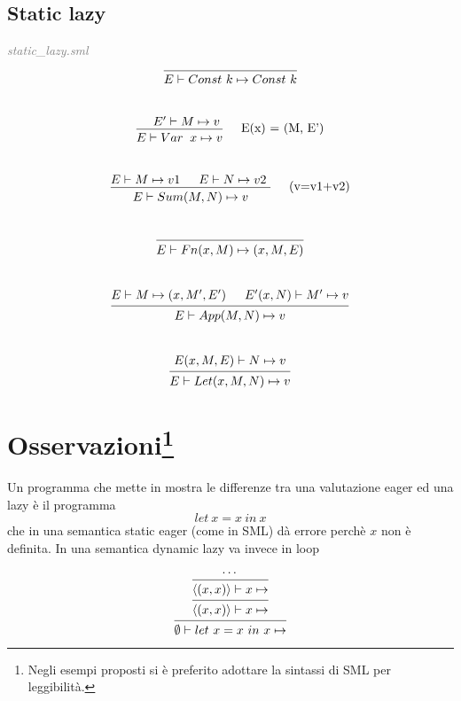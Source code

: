 \documentclass[a4paper]{article}
\begin{document}
	\subsection{Static lazy}
	\textit{\textcolor{gray}{static\_lazy.sml}} \\
	\[
		\begin{prooftree}
			\hypo{}
			\infer1[]{E \vdash Const \ k \mapsto Const \ k} 
		\end{prooftree}
	\]
	\\
	\[
		\begin{prooftree}
			\hypo{E' \vdash M \mapsto v }
			\infer1[\quad E(x) = (M, E')]{E \vdash Var &x \mapsto v}
		\end{prooftree}
	\]
	\\
	\[
		\begin{prooftree}
			\hypo{E \vdash M \mapsto v1}
			\hypo{E \vdash N \mapsto v2 }
			\infer2[\quad (v=v1+v2)]{E \vdash Sum(M, N) \mapsto v}
		\end{prooftree}
	\]
	\\
	\[
		\begin{prooftree}
			\hypo{}
			\infer1[]{E \vdash Fn(x, M) \mapsto (x, M, E)}
		\end{prooftree}
	\]
	\\
	\[
		\begin{prooftree}
			\hypo{E \vdash M \mapsto (x, M', E')}
			\hypo{E'(x, N) \vdash M' \mapsto v}
			\infer2[]{E \vdash App(M, N) \mapsto v}
		\end{prooftree}
	\]
	\\
	\[
		\begin{prooftree}
			\hypo{E(x, M, E) \vdash N \mapsto v}
			\infer1[]{E \vdash Let(x, M, N) \mapsto v}
		\end{prooftree}
	\]
	
	\section[Osservazioni]{Osservazioni\footnote{Negli esempi proposti si è preferito adottare la sintassi di SML per leggibilità.}}
	Un programma che mette in mostra le differenze tra una valutazione eager ed una lazy è il programma 
	\[ let \ x = x \ in \ x \]
	che in una semantica static eager (come in SML) dà errore perchè $x$ non è definita. In una semantica dynamic lazy va invece in loop

	\begin{figure}[ht]
	\[
		\begin{prooftree}
			\hypo{\cdots}
			\infer1[]{\langle (x,x) \rangle \vdash x \mapsto }
			\infer1[]{\langle (x,x) \rangle \vdash x \mapsto }
			\infer1[]{\emptyset \vdash let \ x=x \ in \ x \mapsto }
		\end{prooftree}
	\]
	\end{figure}
\end{document}
